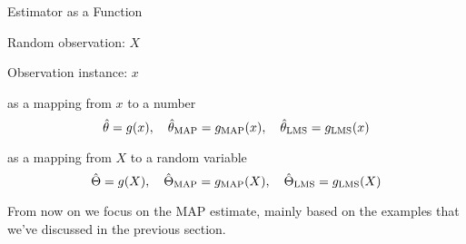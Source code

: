 \begin{frame}{Estimator as a Function}

\plitemsep 0.3in
\bci
\item Random observation: $X$ 

\item Observation instance: $x$

\item<1->  as a mapping from $x$ to a number
$$\hat{\theta} = g(x),\quad \hat{\theta}_{\text{MAP}} = g_{\text{MAP}}(x),\quad \hat{\theta}_{\text{LMS}} = g_{\text{LMS}}(x)$$

\item<2->  as a mapping from $X$ to a random variable
$$\hat{\Theta} = g(X), \quad \hat{\Theta}_{\text{MAP}} = g_{\text{MAP}}(X), \quad \hat{\Theta}_{\text{LMS}} = g_{\text{LMS}}(X)$$



\eci

\end{frame}


\begin{frame}{}

\vspace{2cm}
  {\Large From now on we focus on the MAP estimate, mainly based on the
  examples that we've discussed in the previous section.} 

\end{frame}


